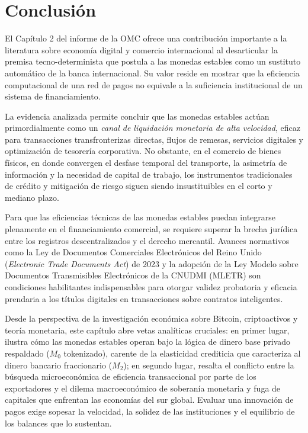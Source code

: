 \documentclass[spanish,11pt]{article}
\begin{document}
\section{Conclusión}\label{conclusion}

El Capítulo 2 del informe de la OMC ofrece una contribución importante a la literatura sobre economía digital y comercio internacional al 
desarticular la premisa tecno-determinista que postula a las monedas estables como un sustituto automático de la banca internacional. 
Su valor reside en mostrar que la eficiencia computacional de una red de pagos no equivale a la suficiencia institucional de un sistema de 
financiamiento.

La evidencia analizada permite concluir que las monedas estables actúan primordialmente como un \emph{canal de liquidación monetaria de alta velocidad}, 
eficaz para transacciones transfronterizas directas, flujos de remesas, servicios digitales y optimización de tesorería corporativa. No obstante, en el comercio de bienes físicos, en donde convergen el desfase temporal del transporte, la asimetría de información y la necesidad de capital de trabajo, 
los instrumentos tradicionales de crédito y mitigación de riesgo siguen siendo insustituibles en el corto y mediano plazo.

Para que las eficiencias técnicas de las monedas estables puedan integrarse plenamente en el financiamiento comercial, se requiere superar la 
brecha jurídica entre los registros descentralizados y el derecho mercantil. Avances normativos como la Ley de Documentos Comerciales Electrónicos 
del Reino Unido (\emph{Electronic Trade Documents Act}) de 2023 y la adopción de la Ley Modelo sobre Documentos Transmisibles Electrónicos de la 
CNUDMI (MLETR) son condiciones habilitantes indispensables para otorgar validez probatoria y eficacia prendaria a los títulos digitales 
en transacciones sobre contratos inteligentes.

Desde la perspectiva de la investigación económica sobre Bitcoin, criptoactivos y teoría monetaria, este capítulo abre vetas analíticas cruciales: 
en primer lugar, ilustra cómo las monedas estables operan bajo la lógica de dinero base privado respaldado ($M_0$ tokenizado), carente de 
la elasticidad crediticia que caracteriza al dinero bancario fraccionario ($M_2$); en segundo lugar, resalta el conflicto entre la búsqueda 
microeconómica de eficiencia transaccional por parte de los exportadores y el dilema macroeconómico de soberanía monetaria y fuga de capitales 
que enfrentan las economías del sur global. Evaluar una innovación de pagos exige sopesar la velocidad, la solidez de las instituciones y el 
equilibrio de los balances que lo sustentan.
\end{document}

